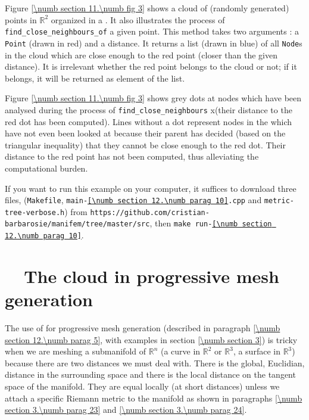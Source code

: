 Figure \ref{\numb section 11.\numb fig 3} shows a cloud of (randomly generated) points in
$ \mathbb{R}^2 $ organized in a {\small\tt{}}.
It also illustrates the process of {\small\tt find\_close\_neighbours\_of} a given point.
This method takes two arguments : a {\small\tt Point} (drawn in red) and a distance.
It returns a list (drawn in blue) of all {\small\tt Node}s in the cloud which are close enough
to the red point (closer than the given distance).
It is irrelevant whether the red point belongs to the cloud or not;
if it belongs, it will be returned as element of the list.

Figure \ref{\numb section 11.\numb fig 3} shows grey dots at nodes which have been analysed
during the process of {\small\tt find\_close\_neighbours}
x(their distance to the red dot has been computed).
Lines without a dot represent nodes in the {\small\tt{}} which have not even been
looked at because their parent has decided (based on the triangular inequality)
that they cannot be close enough to the red dot.
Their distance to the red point has not been computed, thus alleviating the computational
burden.

If you want to run this example on your computer, it suffices to download three files,
({\small\tt Makefile}, {\small\tt main-\ref{\numb section 12.\numb parag 10}.cpp} and
{\small\tt metric-tree-verbose.h}) from\hfil\break
{\small\tt https://github.com/cristian-barbarosie/manifem/tree/master/src},\hfil\break
then {\small\tt make run-\ref{\numb section 12.\numb parag 10}}.


\section{~~The cloud in progressive mesh generation}\label{\numb section 12.\numb parag 11}

The use of {\small\tt{}} for progressive mesh generation (described in paragraph
\ref{\numb section 12.\numb parag 5}, with examples in section \ref{\numb section 3})
is tricky when we are meshing a submanifold of $ \mathbb{R}^n $
(a curve in $ \mathbb{R}^2 $ or $ \mathbb{R}^3 $, a surface in $ \mathbb{R}^3 $)
because there are two distances we must deal with.
There is the global, Euclidian, distance in the surrounding space
and there is the local distance on the tangent space of the manifold.
They are equal locally (at short distances) unless we attach a specific Riemann metric
to the manifold as shown in paragraphs \ref{\numb section 3.\numb parag 23} and
\ref{\numb section 3.\numb parag 24}.

